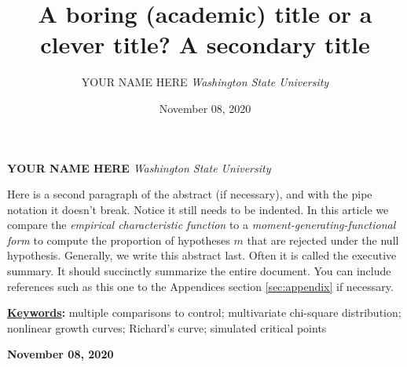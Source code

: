 \documentclass[]{article}
\title{\textbf{\textcolor{WSU.crimson}{A boring (academic) title or a
clever title?}} \newline \textbf{\textcolor{WSU.gray}{A secondary
title}}  }
\author{\Large YOUR NAME
HERE\vspace{0.05in} \newline\normalsize\emph{Washington State
University}  }
\date{November 08, 2020}
\newcommand*{\authorfont}{\fontfamily{phv}\selectfont}
\renewenvironment{abstract}
 {{%
    \setlength{\leftmargin}{0mm}
    \setlength{\rightmargin}{\leftmargin}%
  }%
  \relax}
 {\endlist}
\begin{document}
	
%    


{%
\setlength{\parindent}{0pt}
\thispagestyle{plain}
{\fontsize{18}{20}\selectfont\raggedright 
\maketitle  %

}

{
   \vskip 13.5pt\relax \normalsize\fontsize{11}{12} 
   
\textbf{\authorfont YOUR NAME HERE} \hskip 15pt \emph{\small Washington
State University}   

}

}








\begin{abstract}

    \hbox{\vrule height .2pt width 39.14pc}

    \vskip 8.5pt %

\noindent \noindent Here is a second paragraph of the abstract (if
necessary), and with the pipe notation it doesn't break. Notice it still
needs to be indented. \vspace{0.25in} In this article we compare the
\emph{empirical characteristic function} \citep{Tukey:1977, Becker:1988}
to a \emph{moment-generating-functional form} to compute the proportion
of hypotheses \(m\) that are rejected under the null hypothesis.
\vspace{0.25in} \noindent Generally, we write this abstract last. Often
it is called the executive summary. It should succinctly summarize the
entire document. You can include references such as this one to the
Appendices section \ref{sec:appendix} if necessary.


\vskip 8.5pt \noindent \textbf{\underline{Keywords}:} multiple
comparisons to control; multivariate chi-square distribution; nonlinear
growth curves; Richard's curve; simulated critical points \par

    




    
    \hbox{\vrule height .2pt width 39.14pc}
    \vskip 5pt 
    \hfill \textbf{\textcolor{WSU.gray}{ November 08, 2020 } }
    \vskip 5pt 
    
\end{abstract}
\end{document}
